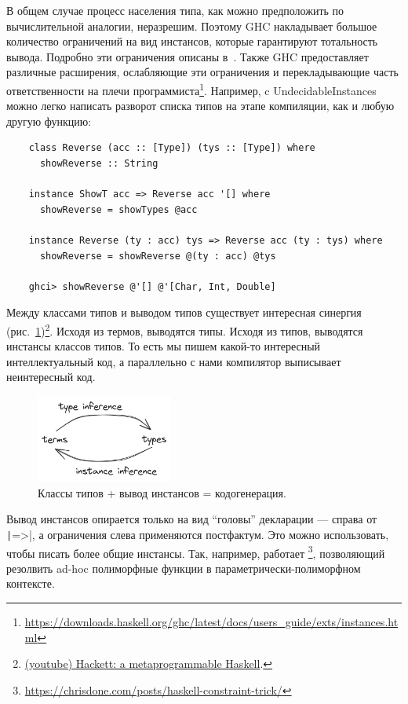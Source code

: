 В общем случае процесс населения типа, как можно предположить по вычислительной аналогии, неразрешим.
Поэтому GHC накладывает большое количество ограничений на вид инстансов, которые гарантируют тотальность вывода.
Подробно эти ограничения описаны в~\cite{sulzmann2007understanding}.
Также GHC предоставляет различные расширения, ослабляющие эти ограничения и перекладывающие часть ответственности на плечи программиста\footnote{\url{https://downloads.haskell.org/ghc/latest/docs/users_guide/exts/instances.html}}.
Например, c UndecidableInstances можно легко написать разворот списка типов на этапе компиляции, как и любую другую функцию:
\begin{verbatim}
    class Reverse (acc :: [Type]) (tys :: [Type]) where
      showReverse :: String

    instance ShowT acc => Reverse acc '[] where
      showReverse = showTypes @acc

    instance Reverse (ty : acc) tys => Reverse acc (ty : tys) where
      showReverse = showReverse @(ty : acc) @tys

    ghci> showReverse @'[] @'[Char, Int, Double]
\end{verbatim}

Между классами типов и выводом типов существует интересная синергия (рис.~\ref{fig:class-sinergy})\footnote{\href{https://youtu.be/5QQdI3P7MdY?si=VAgqyD7iycALTrz_}{(youtube) Hackett: a metaprogrammable Haskell}.}.
Исходя из термов, выводятся типы.
Исходя из типов, выводятся инстансы классов типов.
То есть мы пишем какой-то интересный интеллектуальный код, а параллельно с нами компилятор выписывает неинтересный код.

\begin{figure}
    \centering
    \includegraphics[width=0.4\textwidth]{figs/class-sinergy}
    \caption{Классы типов + вывод инстансов = кодогенерация.}
    \label{fig:class-sinergy}
\end{figure}

Вывод инстансов опирается только на вид ``головы'' декларации --- справа от \texttt|=>|, а ограничения слева применяются постфактум.
Это можно использовать, чтобы писать более общие инстансы.
Так, например, работает \footnote{\url{https://chrisdone.com/posts/haskell-constraint-trick/}}, позволяющий резолвить ad-hoc полиморфные функции в параметрически-полиморфном контексте.

